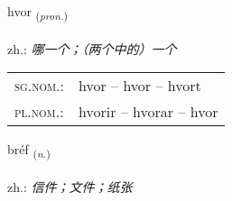 \documentclass[frontgrid, backgrid]{flacards}\usepackage[]{graphicx}\usepackage[]{xcolor}
\begin{document}
\renewcommand{\blhead}{\vskip5pt {\small\bfseries\footnotesize Fornafn | 代词 }}
\renewcommand{\bcfoot}{\vskip5pt \hspace{2pt}{\small\bfseries\footnotesize 1K}}


{hvor \small{\textsubscript{(\textit{pron.})}} \\[1ex] %
\textphonetic{[kʰvɔːr]} \\
zh.: \emph{哪一个；（两个中的）一个} \\  [2ex]
\renewcommand*{\arraystretch}{0.8}
\begin{tabular}{ll}
\textsc{sg.nom.}: & hvor  --  hvor -- hvort \\ 
\textsc{pl.nom.}: & hvorir -- hvorar -- hvor
\end{tabular}
}

\renewcommand{\flhead}{\vskip5pt \fboxsep=0pt {\small\bfseries\footnotesize Nafnorð | 名词}}
\renewcommand{\fcfoot}{\vskip5pt \fboxsep=0pt \hspace{2pt}{\small\bfseries\footnotesize 1K}}

\renewcommand{\blhead}{\vskip5pt {\small\bfseries\footnotesize Nafnorð | 名词 }}
\renewcommand{\bcfoot}{\vskip5pt \hspace{2pt}{\small\bfseries\footnotesize 1K}}


{bréf \small{\textsubscript{(\textit{n.})}} \\[1ex] %
\textphonetic{[prjɛːv]} \\
zh.: \emph{信件；文件；纸张} \\  [2ex]
\renewcommand*{\arraystretch}{0.8}
}

\renewcommand{\flhead}{\vskip5pt \fboxsep=0pt {\small\bfseries\footnotesize Sagnorð | 动词}}
\renewcommand{\fcfoot}{\vskip5pt \fboxsep=0pt \hspace{2pt}{\small\bfseries\footnotesize 1K}}
\end{document}
